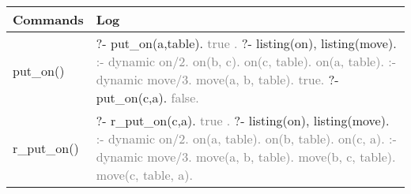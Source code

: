 \documentclass{article}
\begin{document}
            \begin{tabular}{|p{6cm}|p{6cm}|}
                \hline
                    \textbf{Commands} & \textbf{Log}\\
                \hline

                \hline
                    put\_on() & ?- put\_on(a,table).
                    \newline \textcolor{gray}{    true .}
                    \newline ?- listing(on), listing(move).
                    \newline \textcolor{gray}{:- dynamic on/2.}
                    \newline \textcolor{gray}{    on(b, c).}
                    \newline \textcolor{gray}{    on(c, table).}
                    \newline \textcolor{gray}{    on(a, table).}
                    \newline \textcolor{gray}{:- dynamic move/3.}
                    \newline \textcolor{gray}{    move(a, b, table).}
                    \newline \textcolor{gray}{    true.}
                    \newline ?- put\_on(c,a).
                    \newline \textcolor{gray}{    false.}\\
                \hline
                    r\_put\_on() & ?- r\_put\_on(c,a).
                    \newline \textcolor{gray}{    true .}
                    \newline ?- listing(on), listing(move).
                    \newline \textcolor{gray}{:- dynamic on/2.}
                    \newline \textcolor{gray}{    on(a, table).}
                    \newline \textcolor{gray}{    on(b, table).}
                    \newline \textcolor{gray}{    on(c, a).}
                    \newline \textcolor{gray}{:- dynamic move/3.}
                    \newline \textcolor{gray}{    move(a, b, table).}
                    \newline \textcolor{gray}{    move(b, c, table).}
                    \newline \textcolor{gray}{    move(c, table, a).}

\end{tabular}
\end{document}
